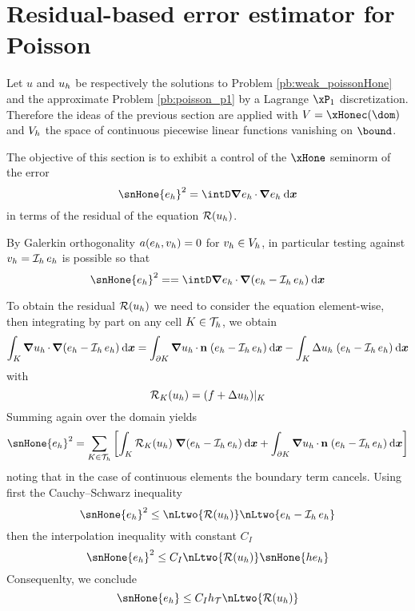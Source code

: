 \section{Residual-based error estimator for Poisson}

Let $u$ and ${u_h}$ be respectively the solutions to Problem \eqref{pb:weak_poissonHone} and the approximate Problem \eqref{pb:poisson_p1} by a Lagrange $\xPone$ discretization.
Therefore the ideas of the previous section are applied with $\xV = \xHonec(\dom)$ and ${{V}}_h$ the space of continuous piecewise linear functions vanishing on $\bound$.

\medskip
The objective of this section is to exhibit a control of the $\xHone$ seminorm of the error
\begin{equation*}
\snHone{e_h}^2 = \intD \Grad e_h \xDot \Grad e_h \dxx
\end{equation*}
in terms of the residual of the equation ${\mathcal{R}({u_h})}$.

\medskip
By Galerkin orthogonality $a(e_h, {v_h}) = 0$ for ${v_h} \in {{V}}_h$, in particular testing against ${v_h} = \mathop{\mathcal{I}_{h}} e_h$ is possible so that
\begin{equation*}
\snHone{e_h}^2 =  = \intD \Grad e_h \xDot \Grad (e_h - \Iop{h} e_h)\dxx
\end{equation*}

To obtain the residual ${\mathcal{R}({u_h})}$ we need to consider the equation element-wise, then integrating by part on any cell $K \in {\mathcal T}_h$, we obtain
\begin{equation*}
\int_K {\boldsymbol\nabla} {u_h} \,{\mathbf\cdot}\, {\boldsymbol\nabla} (e_h - \mathop{\mathcal{I}_{h}} e_h) \hspace{.5ex}{\mathrm d}{\boldsymbol x} = \int_{\partial K} {\boldsymbol\nabla} {u_h} \,{\mathbf\cdot}\, \mathbf n\;(e_h - \mathop{\mathcal{I}_{h}} e_h) \hspace{.5ex}{\mathrm d}{\boldsymbol x} - \int_K \Delta {u_h} \; (e_h - \mathop{\mathcal{I}_{h}} e_h) \hspace{.5ex}{\mathrm d}{\boldsymbol x}
\end{equation*}
with
\begin{equation*}
{\mathcal{R}_K({u_h})} = (f + \Delta {u_h})\rvert_K
\end{equation*}
Summing again over the domain yields
\begin{equation*}
\snHone{e_h}^2 = \sum _{K\in\meshT}\left[\int_K \ResK{\uh}\; \Grad (e_h - \Iop{h} e_h) \dxx + \int_{\partial K} \Grad \uh \xDot \n\;(e_h - \Iop{h} e_h) \dxx \right]
\end{equation*}
noting that in the case of continuous elements the boundary term cancels.
Using first the Cauchy--Schwarz inequality
\begin{equation*}
\snHone{e_h}^2 \leq \nLtwo{\Res{\uh}} \nLtwo{e_h - \Iop{h} e_h}
\end{equation*}
then the interpolation inequality with constant $C_I$
\begin{equation*}
\snHone{e_h}^2 \leq C_I \nLtwo{\Res{\uh}} \snHone{h e_h}
\end{equation*}
Consequenlty, we conclude
\begin{equation*}
\snHone{e_h} \leq C_I \sizeT \nLtwo{\Res{\uh}}
\end{equation*}


